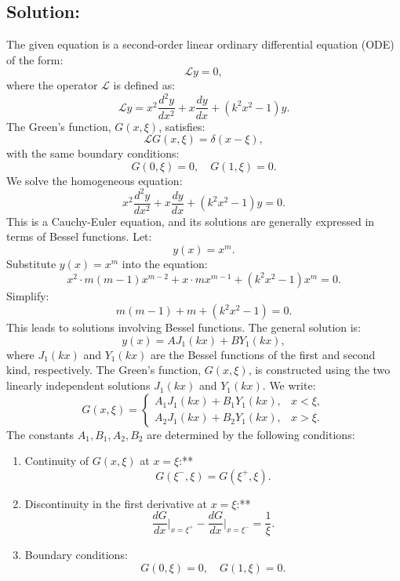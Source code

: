 \documentclass[12pt]{article}
\begin{document}
    \subsection*{Solution:}
        The given equation is a second-order linear ordinary differential equation (ODE) of the form:
        \[
        \mathcal{L}y = 0,
        \]
        where the operator \(\mathcal{L}\) is defined as:
        \[
        \mathcal{L}y = x^2 \frac{d^2 y}{dx^2} + x \frac{dy}{dx} + \left(k^2 x^2 - 1\right)y.
        \]
        The Green's function, \(G(x, \xi)\), satisfies:
        \[
        \mathcal{L}G(x, \xi) = \delta(x - \xi),
        \]
        with the same boundary conditions:
        \[
        G(0, \xi) = 0, \quad G(1, \xi) = 0.
        \]
        We solve the homogeneous equation:
        \[
        x^2 \frac{d^2 y}{dx^2} + x \frac{dy}{dx} + \left(k^2 x^2 - 1\right)y = 0.
        \]
        This is a Cauchy-Euler equation, and its solutions are generally expressed in terms of Bessel functions. Let:
        \[
        y(x) = x^m.
        \]
        Substitute \(y(x) = x^m\) into the equation:
        \[
        x^2 \cdot m(m-1)x^{m-2} + x \cdot mx^{m-1} + \left(k^2 x^2 - 1\right)x^m = 0.
        \]
        Simplify:
        \[
        m(m-1) + m + (k^2 x^2 - 1) = 0.
        \]
        This leads to solutions involving Bessel functions. The general solution is:
        \[
        y(x) = A J_1(kx) + B Y_1(kx),
        \]
        where \(J_1(kx)\) and \(Y_1(kx)\) are the Bessel functions of the first and second kind, respectively.
        The Green's function, \(G(x, \xi)\), is constructed using the two linearly independent solutions \(J_1(kx)\) and \(Y_1(kx)\). We write:
        \[
        G(x, \xi) =
        \begin{cases} 
        A_1 J_1(kx) + B_1 Y_1(kx), & x < \xi, \\
        A_2 J_1(kx) + B_2 Y_1(kx), & x > \xi.
        \end{cases}
        \]
        The constants \(A_1, B_1, A_2, B_2\) are determined by the following conditions:
        \begin{enumerate}
            \item Continuity of \(G(x, \xi)\) at \(x = \xi\):**
                \[
                    G(\xi^-, \xi) = G(\xi^+, \xi).
                \]
            \item Discontinuity in the first derivative at \(x = \xi\):**
                \[
                    \frac{dG}{dx}\Big|_{x=\xi^+} - \frac{dG}{dx}\Big|_{x=\xi^-} = \frac{1}{\xi}.
                \]
            \item Boundary conditions:
                \[
                    G(0, \xi) = 0, \quad G(1, \xi) = 0.
                \]
        \end{enumerate}
\end{document}
